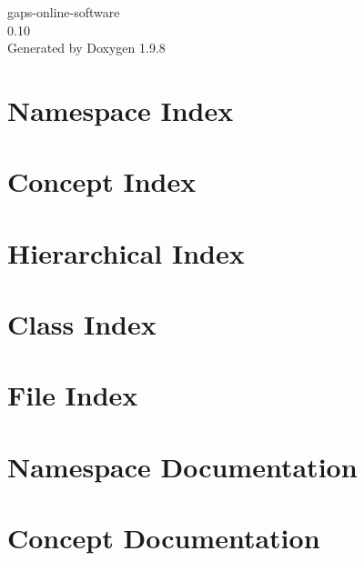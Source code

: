 \documentclass[twoside]{book}
\newcommand{\+}{\discretionary{\mbox{\scriptsize$\hookleftarrow$}}{}{}}
\newcommand{\clearemptydoublepage}{%
    \newpage{\pagestyle{empty}\cleardoublepage}%
  }
\begin{document}
  \raggedbottom
    \hypersetup{pageanchor=false,
                bookmarksnumbered=true,
                pdfencoding=unicode
               }
  \begin{titlepage}
  \vspace*{7cm}
  \begin{center}%
  {\Large gaps-\/online-\/software}\\
  [1ex]\large 0.\+10 \\
  \vspace*{1cm}
  {\large Generated by Doxygen 1.9.8}\\
  \end{center}
  \end{titlepage}
  \clearemptydoublepage
  \tableofcontents
  \clearemptydoublepage
  \hypersetup{pageanchor=true}

\chapter{Namespace Index}

\chapter{Concept Index}

\chapter{Hierarchical Index}

\chapter{Class Index}

\chapter{File Index}

\chapter{Namespace Documentation}

\chapter{Concept Documentation}

\end{document}
